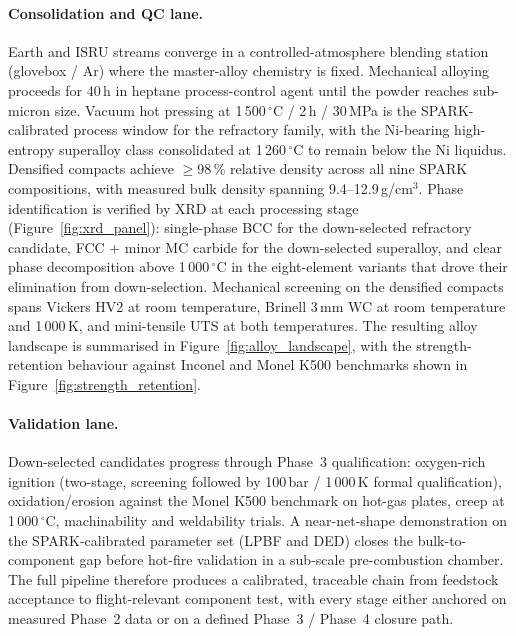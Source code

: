\documentclass[11pt,a4paper]{article}
\begin{document}
\paragraph{Consolidation and QC lane.} Earth and ISRU streams converge in a controlled-atmosphere blending station (glovebox / Ar) where the master-alloy chemistry is fixed. Mechanical alloying proceeds for 40\,h in heptane process-control agent until the powder reaches sub-micron size. Vacuum hot pressing at 1\,500\,$^\circ$C / 2\,h / 30\,MPa is the SPARK-calibrated process window for the refractory family, with the Ni-bearing high-entropy superalloy class consolidated at 1\,260\,$^\circ$C to remain below the Ni liquidus. Densified compacts achieve $\geq$98\,\% relative density across all nine SPARK compositions, with measured bulk density spanning 9.4--12.9\,g/cm$^3$. Phase identification is verified by XRD at each processing stage (Figure~\ref{fig:xrd_panel}): single-phase BCC for the down-selected refractory candidate, FCC + minor MC carbide for the down-selected superalloy, and clear phase decomposition above 1\,000\,$^\circ$C in the eight-element variants that drove their elimination from down-selection. Mechanical screening on the densified compacts spans Vickers HV2 at room temperature, Brinell 3\,mm WC at room temperature and 1\,000\,K, and mini-tensile UTS at both temperatures. The resulting alloy landscape is summarised in Figure~\ref{fig:alloy_landscape}, with the strength-retention behaviour against Inconel and Monel K500 benchmarks shown in Figure~\ref{fig:strength_retention}.

\paragraph{Validation lane.} Down-selected candidates progress through Phase~3 qualification: oxygen-rich ignition (two-stage, screening followed by 100\,bar / 1\,000\,K formal qualification), oxidation/erosion against the Monel K500 benchmark on hot-gas plates, creep at 1\,000\,$^\circ$C, machinability and weldability trials. A near-net-shape demonstration on the SPARK-calibrated parameter set (LPBF and DED) closes the bulk-to-component gap before hot-fire validation in a sub-scale pre-combustion chamber. The full pipeline therefore produces a calibrated, traceable chain from feedstock acceptance to flight-relevant component test, with every stage either anchored on measured Phase~2 data or on a defined Phase~3 / Phase~4 closure path.
\end{document}
